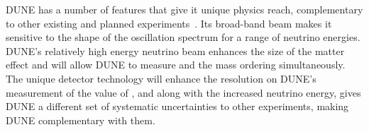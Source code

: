 DUNE has a number of features that give it unique physics reach, complementary to other existing and planned experiments~\cite{Ayres:2007tu,Abe:2011ks,Abe:2018uyc}. Its broad-band beam makes it sensitive to the shape of the oscillation spectrum for a range of neutrino energies. DUNE's relatively high energy neutrino beam enhances the size of the matter effect and will allow DUNE to measure \deltacp and the mass ordering simultaneously. The unique  detector technology will enhance the resolution on DUNE's measurement of the value of \deltacp, and along with the increased neutrino energy, gives DUNE a different set of systematic uncertainties to other experiments, making DUNE complementary with them.

